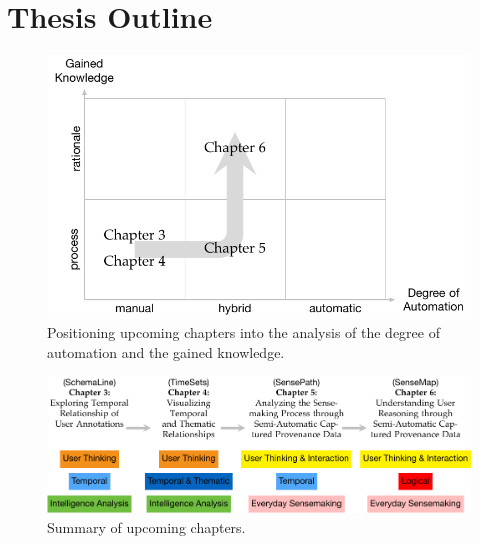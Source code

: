 
\section{Thesis Outline} 

\begin{figure}[ht]
	\centering
	\includegraphics[width=\linewidth]{work}
	\caption{Positioning upcoming chapters into the analysis of the degree of automation and the gained knowledge.}
	\label{fig:work}
\end{figure}

\begin{figure}[ht]
	\centering
	\includegraphics[width=\linewidth]{story}
	\caption{Summary of upcoming chapters.}
	\label{fig:story}
\end{figure}

%
%
%
%
%
%
